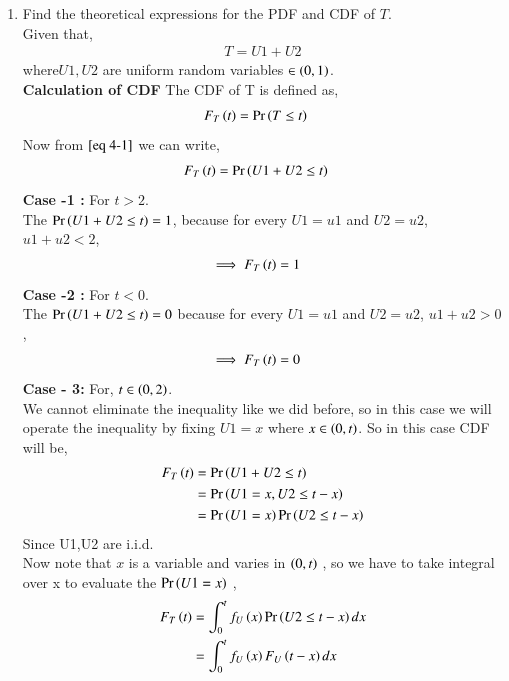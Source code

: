 \documentclass[journal,12pt,twocolumn]{IEEEtran}
\renewcommand\thesection{\arabic{section}}
\begin{document}
\begin{enumerate}[label=\thesection.\arabic*,ref=\thesection.\theenumi]
\begin{enumerate}[label=\thesection.\arabic*
,ref=\thesection.\theenumi]
\begin{figure}
  \label{fig:tri_pdf}
 \end{figure}
\item Find the theoretical expressions for the PDF and CDF of $T$.\\
  \solution Given that,
   \begin{align}
           T = U1 + U2 \label{eq 4-1} 
   \end{align}
where$ U1, U2 $ are uniform random variables $\in \left(0,1\right)$.\\
 \textbf{Calculation of CDF}
The CDF of T is defined as,
   \begin{align}
            F_{T}\left(t\right) &= \Pr\left(T \leq t\right)
   \end{align}
  Now from $\eqref{eq 4-1}$ we can write,
   \begin{align}
           F_{T}\left(t\right)  &= \Pr\left(U1 + U2 \leq t\right)
   \end{align}
 \textbf{Case -1 :} For $ t> 2$.\\
  The $\Pr\left( U1 + U2 \leq t\right) = 1$, because for every $ U1 = u1$ and $U2 = u2$, $u1 + u2 <2$,
   \begin{align}
           \implies F_{T}\left(t\right) &= 1 
   \end{align}
 \textbf{Case -2 :} For $ t<0$.\\
  The $\Pr\left( U1 + U2 \leq t\right) = 0$ because for every $ U1 = u1$ and $U2 = u2$, $u1 + u2 >0$,
   \begin{align}
           \implies F_{T}\left(t\right) &= 0 
   \end{align}
 \textbf{Case - 3:} For, $ t \in \left(0,2\right) $.\\
  We cannot eliminate the inequality like we did before, so in this case we will operate the inequality by fixing $U1 = x$ where $x\in \left(0,t\right) $. So in this case CDF will be,
   \begin{align}
           F_{T}\left(t\right)  &= \Pr\left(U1 + U2 \leq t\right)\\
                          &= \Pr\left(U1 = x,U2 \leq t-x\right)\\
                          &= \Pr\left(U1 = x\right)\Pr\left(U2 \leq t-x\right)  
   \end{align}
 Since U1,U2 are i.i.d.\\
  Now note that $ x$ is a variable and varies in $\left(0,t\right)$ , so we have to take integral over x to evaluate the $\Pr\left(U1=x\right)$ ,
   \begin{align}
           F_{T}\brak{t} &= \int_{0}^{t} f_{U}\brak{x}\pr{U2 \leq t-x} dx\\
                         & =\int_{0}^{t} f_{U}\brak{x}F_{U}\brak{t-x} dx

\end{align}
\end{enumerate}
\end{enumerate}
\end{document}
